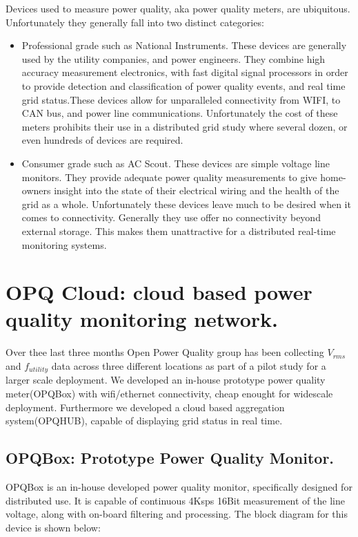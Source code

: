 Devices used to measure power quality, aka power quality meters, are ubiquitous. Unfortunately they generally fall into two distinct categories:
\begin{itemize}
\item Professional grade such as National Instruments. These devices are generally used by the utility companies, and power engineers. They combine high accuracy measurement electronics, with 
fast digital signal processors in order to provide detection and classification of power quality events, and real time grid status.These devices allow for unparalleled connectivity
from WIFI, to CAN bus, and power line communications.  Unfortunately the cost of these meters prohibits their use in a distributed grid study where several dozen, or even hundreds of devices are required.
\item Consumer grade such as AC Scout\textregistered. These devices are simple voltage line monitors. They provide adequate power quality measurements to give home-owners insight into the state of their electrical wiring and the
health of the grid as a whole. Unfortunately these devices leave much to be desired when it comes to connectivity. Generally they use offer no connectivity beyond external storage. This makes them
unattractive for a distributed real-time monitoring systems.
\end{itemize}

\section{OPQ Cloud: cloud based power quality monitoring network.}
Over thee last three months Open Power Quality group has been collecting $V_{rms}$ and $f_{utility}$ data across three different locations as part of
a pilot study for a larger scale deployment. We developed an in-house prototype power quality meter(OPQBox) with wifi/ethernet connectivity, cheap enought for widescale deployment.
Furthermore we developed a cloud based aggregation system(OPQHUB), capable of displaying grid status in real time.

\subsection{OPQBox: Prototype Power Quality Monitor.}

OPQBox is an in-house developed power quality monitor, specifically designed for distributed use. It is capable of continuous  4Ksps 16Bit measurement of the line voltage, along with
on-board filtering and processing. The block diagram for this device is shown below:

